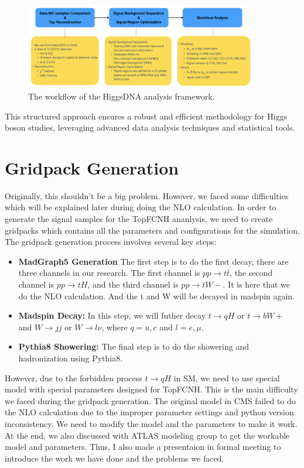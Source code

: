 \begin{figure}[htbp]
\centering
\includegraphics[width=0.9\textwidth]{Figures/workflow.png}
\caption{The workflow of the HiggsDNA analysis framework.}
\label{fig:workflow}
\end{figure}

This structured approach ensures a robust and efficient methodology for Higgs boson studies, leveraging advanced data analysis techniques and statistical tools.

\section{Gridpack Generation}

Originally, this shouldn't be a big problem. However, we faced some difficulties which will be explained later during doing the NLO calculation. In order to generate the signal samples for the TopFCNH ananlysis, we need to create gridpacks which contains all the parameters and configurations for the simulation. The gridpack generation process involves several key steps:

\begin{itemize}
\item \textbf{MadGraph5 Generation} 
The first step is to do the first decay, there are three channels in our research. The first channel is $pp \to t\bar{t}$, the second channel is $pp \to tH$, and the third channel is $pp \to tW-$. It is here that we do the NLO calculation. And the t and W will be decayed in madspin again. 
\item \textbf{Madspin Decay:} 
In this step, we will futher decay $t \to qH$ or $t \to bW+$ and $W \to j j$ or $W \to l \nu$, where $q = u, c$ and $l = e, \mu$.
\item \textbf{Pythia8 Showering:}
The final step is to do the showering and hadronization using Pythia8.
\end{itemize}

However, due to the forbidden process $t \to qH$ in SM, we need to use special model with special parameters designed for TopFCNH. This is the main difficulty we faced during the gridpack generation.
The original model in CMS failed to do the NLO calculation due to the improper parameter settings and python version inconsistency. We need to modify the model and the parameters to make it work. At the end, we also discussed with ATLAS modeling group to get the workable model and parameters. Thus, I also made a presentaion in formal meeting to introduce the work we have done and the problems we faced.

